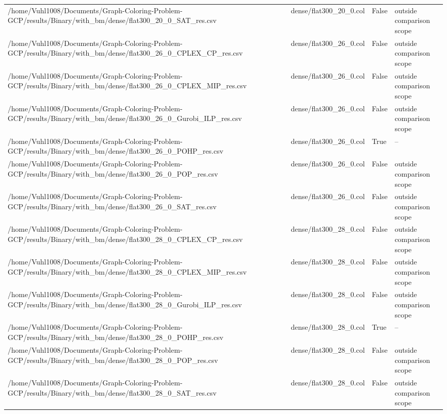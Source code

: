 \begin{table}[htbp]
\begin{tabular}{llll}
/home/Vuhl1008/Documents/Graph-Coloring-Problem-GCP/results/Binary/with\_bm/dense/flat300\_20\_0\_SAT\_res.csv & dense/flat300\_20\_0.col & False & outside comparison scope \\
/home/Vuhl1008/Documents/Graph-Coloring-Problem-GCP/results/Binary/with\_bm/dense/flat300\_26\_0\_CPLEX\_CP\_res.csv & dense/flat300\_26\_0.col & False & outside comparison scope \\
/home/Vuhl1008/Documents/Graph-Coloring-Problem-GCP/results/Binary/with\_bm/dense/flat300\_26\_0\_CPLEX\_MIP\_res.csv & dense/flat300\_26\_0.col & False & outside comparison scope \\
/home/Vuhl1008/Documents/Graph-Coloring-Problem-GCP/results/Binary/with\_bm/dense/flat300\_26\_0\_Gurobi\_ILP\_res.csv & dense/flat300\_26\_0.col & False & outside comparison scope \\
/home/Vuhl1008/Documents/Graph-Coloring-Problem-GCP/results/Binary/with\_bm/dense/flat300\_26\_0\_POHP\_res.csv & dense/flat300\_26\_0.col & True & -- \\
/home/Vuhl1008/Documents/Graph-Coloring-Problem-GCP/results/Binary/with\_bm/dense/flat300\_26\_0\_POP\_res.csv & dense/flat300\_26\_0.col & False & outside comparison scope \\
/home/Vuhl1008/Documents/Graph-Coloring-Problem-GCP/results/Binary/with\_bm/dense/flat300\_26\_0\_SAT\_res.csv & dense/flat300\_26\_0.col & False & outside comparison scope \\
/home/Vuhl1008/Documents/Graph-Coloring-Problem-GCP/results/Binary/with\_bm/dense/flat300\_28\_0\_CPLEX\_CP\_res.csv & dense/flat300\_28\_0.col & False & outside comparison scope \\
/home/Vuhl1008/Documents/Graph-Coloring-Problem-GCP/results/Binary/with\_bm/dense/flat300\_28\_0\_CPLEX\_MIP\_res.csv & dense/flat300\_28\_0.col & False & outside comparison scope \\
/home/Vuhl1008/Documents/Graph-Coloring-Problem-GCP/results/Binary/with\_bm/dense/flat300\_28\_0\_Gurobi\_ILP\_res.csv & dense/flat300\_28\_0.col & False & outside comparison scope \\
/home/Vuhl1008/Documents/Graph-Coloring-Problem-GCP/results/Binary/with\_bm/dense/flat300\_28\_0\_POHP\_res.csv & dense/flat300\_28\_0.col & True & -- \\
/home/Vuhl1008/Documents/Graph-Coloring-Problem-GCP/results/Binary/with\_bm/dense/flat300\_28\_0\_POP\_res.csv & dense/flat300\_28\_0.col & False & outside comparison scope \\
/home/Vuhl1008/Documents/Graph-Coloring-Problem-GCP/results/Binary/with\_bm/dense/flat300\_28\_0\_SAT\_res.csv & dense/flat300\_28\_0.col & False & outside comparison scope \\

\end{tabular}
\end{table}
